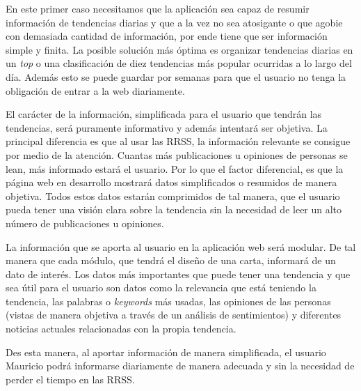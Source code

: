 En este primer caso necesitamos que la aplicación sea capaz de resumir información de tendencias diarias y que a la vez no sea atosigante o que agobie con demasiada cantidad de información, por ende tiene que ser información simple y finita. La posible solución más óptima es organizar tendencias diarias en un \textit{top} o una clasificación de diez tendencias más popular ocurridas a lo largo del día. Además esto se puede guardar por semanas para que el usuario no tenga la obligación de entrar a la web diariamente.

\vspace{0.3cm}

El carácter de la información, simplificada para el usuario que tendrán las tendencias, será puramente informativo y además intentará ser objetiva. La principal diferencia es que al usar las \ac{RRSS}, la información relevante se consigue por medio de la atención. Cuantas más publicaciones u opiniones de personas se lean, más informado estará el usuario. Por lo que el factor diferencial, es que la página web en desarrollo mostrará datos simplificados o resumidos de manera objetiva. Todos estos datos estarán comprimidos de tal manera, que el usuario pueda tener una visión clara sobre la tendencia sin la necesidad de leer un alto número de publicaciones u opiniones.

\vspace{0.3cm}

La información que se aporta al usuario en la aplicación web será modular. De tal manera que cada módulo, que tendrá el diseño de una carta, informará de un dato de interés. Los datos más importantes que puede tener una tendencia y que sea útil para el usuario son datos como la relevancia que está teniendo la tendencia, las palabras o \textit{keywords} más usadas, las opiniones de las personas (vistas de manera objetiva a través de un análisis de sentimientos) y diferentes noticias actuales relacionadas con la propia tendencia.

\vspace{0.3cm}

Des esta manera, al aportar información de manera simplificada, el usuario Mauricio podrá informarse diariamente de manera adecuada y sin la necesidad de perder el tiempo en las \ac{RRSS}.


